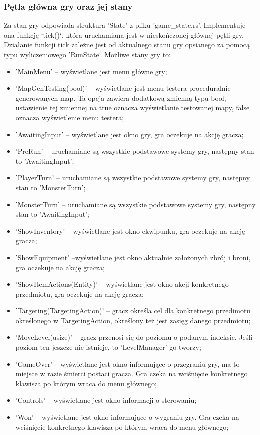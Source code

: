 \documentclass[12pt,twoside]{article}
\begin{document}
\subsubsection{Pętla główna gry oraz jej stany}
Za stan gry odpowiada struktura 'State' z pliku 'game\_state.rs'. Implementuje ona funkcję `tick()`, która uruchamiana jest w nieskończonej głównej pętli gry. Działanie funkcji tick zależne jest od aktualnego stanu gry opsianego za pomocą typu wyliczeniowego 'RunState`. Możliwe stany gry to:
\begin{itemize}
	\item 'MainMenu' -- wyświetlane jest menu główne gry;
	\item 'MapGenTesting(bool)' -- wyświetlane jest menu testera proceduralnie generowanych map. Ta opcja zawiera dodatkową zmienną typu bool, ustawienie tej zmiennej na true oznacza wyświetlanie testowanej mapy, false oznacza wyświetlenie menu testera;
	\item 'AwaitingInput' -- wyświetlane jest okno gry, gra oczekuje na akcję gracza;
	\item 'PreRun' -- uruchamiane są wszystkie podstawowe systemy gry, następny stan to 'AwaitingInput';
	\item 'PlayerTurn' -- uruchamiane są wszystkie podstawowe systemy gry, następny stan to 'MonsterTurn';
	\item 'MonsterTurn' -- uruchamiane są wszystkie podstawowe systemy gry, następny stan to 'AwaitingInput';
	\item 'ShowInventory' -- wyświetlane jest okno ekwipunku, gra oczekuje na akcję gracza;
	\item 'ShowEquipment' --wyświetlane jest okno aktualnie założonych zbrój i broni, gra oczekuje na akcję gracza;
	\item 'ShowItemActions(Entity)' -- wyświetlane jest okno akcji konkretnego przedmiotu, gra oczekuje na akcję gracza;
	\item 'Targeting(TargetingAction)' -- gracz określa cel dla konkretnego przedimotu określonego w TargetingAction, określony też jest zasięg danego przedmiotu;
	\item 'MoveLevel(usize)' -- gracz przenosi się do poziomu o podanym indeksie. Jeśli poziom ten jeszcze nie istnieje, to 'LevelManager' go tworzy;
	\item 'GameOver' -- wyświetlane jest okno informujące o przegraniu gry, ma to miejsce w razie śmierci postaci gracza. Gra czeka na wciśnięcie konkretnego klawisza po którym wraca do menu głównego;
	\item 'Controls' -- wyświetlane jest okno informacji o sterowaniu;
	\item 'Won' -- wyświetlane jest okno informujące o wygraniu gry. Gra czeka na wciśnięcie konkretnego klawisza po którym wraca do menu głównego;
\end{itemize}
\end{document}
